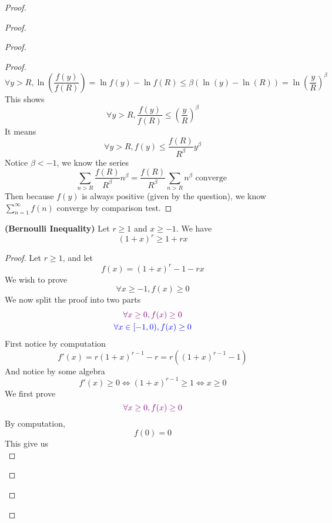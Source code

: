 \documentclass{report}
\begin{document}
\begin{proof}
\begin{proof}
\begin{proof}
\begin{proof}
\begin{equation}
\forall y>R,\ln ( \frac{f(y)}{f(R)})=\ln f(y)-\ln f(R)\leq \beta (\ln(y)-\ln(R))= \ln(\frac{y}{R})^\beta 
\end{equation}
This shows
\begin{equation}
\forall y>R, \frac{f(y)}{f(R)}\leq (\frac{y}{R})^{\beta }
\end{equation}
It means
\begin{equation}
\forall y>R, f(y)\leq \frac{f(R)}{R^{\beta }}y^{\beta }
\end{equation}
Notice $\beta <-1$, we know the series 
\begin{equation}
\sum_{n>R} \frac{f(R)}{R^{\beta }}n^{\beta }=\frac{f(R)}{R^{\beta }}\sum_{n>R}n^{\beta }\text{ converge }
\end{equation}
Then because $f(y)$ is always positive (given by the question), we know $\sum_{n=1}^\infty f(n)$ converge by comparison test.
\end{proof}
\begin{lemma}
\label{8.3.4}
\textbf{(Bernoulli Inequality)} Let  $r\geq 1$ and $x\geq -1$. We have
\begin{equation}
  (1+x)^r\geq 1+rx
\end{equation}
\end{lemma}
\begin{proof}
Let $r\geq 1$, and let
\begin{equation}
f(x)=(1+x)^r-1-rx
\end{equation}
We wish to prove 
\begin{equation}
\forall x\geq -1, f(x)\geq 0
\end{equation}
We now split the proof into two parts
\begin{gather}
  \textcolor{violet}{\forall x\geq 0, f(x)\geq 0}\\
  \textcolor{blue}{\forall x\in [-1,0), f(x)\geq 0}
\end{gather}
First notice by computation
\begin{equation}
f'(x)=r(1+x)^{r-1}-r=r((1+x)^{r-1}-1)
\end{equation}
And notice by some algebra
\begin{equation}
f'(x)\geq 0\iff  (1+x)^{r-1}\geq 1\iff  x\geq 0
\end{equation}
We first prove 
\begin{equation}
\textcolor{violet}{\forall x\geq 0, f(x)\geq 0}
\end{equation}
By computation,
\begin{equation}
f(0)=0
\end{equation}
This give us 
\begin{equation}

\end{equation}
\end{proof}
\end{proof}
\end{proof}
\end{proof}
\end{document}
